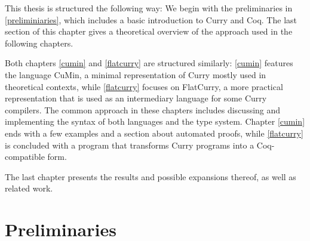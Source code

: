 \documentclass[paper = a4, fleqn, abstract=on, twoside]{scrreprt}
\begin{document}
\par \noindent
This thesis is structured the following way: We begin with the preliminaries in \autoref{preliminiaries}, which includes a basic introduction to Curry and Coq. The last section of this chapter gives a theoretical overview of the approach used in the following chapters.\\
\par \noindent
Both chapters \ref{cumin} and \ref{flatcurry} are structured similarly: \autoref{cumin} features the language CuMin, a minimal representation of Curry mostly used in theoretical contexts, while \autoref{flatcurry} focuses on FlatCurry, a more practical representation that is used as an intermediary language for some Curry compilers.
The common approach in these chapters includes discussing and implementing the syntax of both languages and the type system. Chapter \ref{cumin} ends with a few examples and a section about automated proofs, while \autoref{flatcurry} is concluded with a program that transforms Curry programs into a Coq-compatible form.\\
\par \noindent
The last chapter presents the results and possible expansions thereof, as well as related work. 
\chapter{Preliminaries}
\label{preliminiaries}
\end{document}
